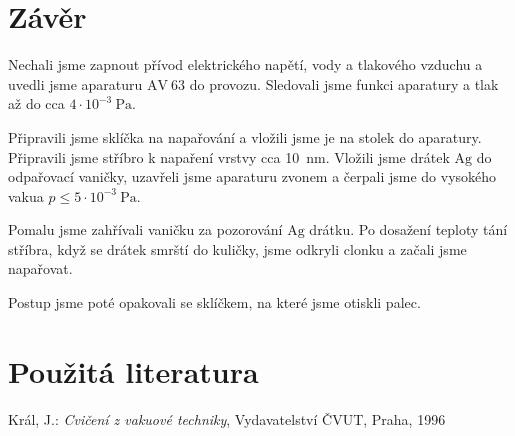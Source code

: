 \documentclass[english]{article}
\newcommand{\unit}[1]{~\mathrm{#1}}
\begin{document}
\section{Závěr}
	Nechali jsme zapnout přívod elektrického napětí, vody a tlakového vzduchu a uvedli jsme aparaturu $\mathrm{AV~63}$ do provozu. Sledovali jsme funkci aparatury a tlak až do cca $4\cdot 10^{-3}\unit{Pa}$. 
	
	Připravili jsme sklíčka na napařování a vložili jsme je na stolek do aparatury. Připravili jsme stříbro k napaření vrstvy cca 10~nm. Vložili jsme drátek $\mathrm{Ag}$ do odpařovací vaničky, uzavřeli jsme aparaturu zvonem a čerpali jsme do vysokého vakua $p\le 5 \cdot 10^{-3}\unit{Pa}$. 
	
	Pomalu jsme zahřívali vaničku za pozorování $\mathrm{Ag}$ drátku. Po dosažení teploty tání stříbra, když se drátek smrští do kuličky, jsme odkryli clonku a začali jsme napařovat.
	
	Postup jsme poté opakovali se sklíčkem, na které jsme otiskli palec.
	
	
\section {Použitá literatura}
\begingroup
\renewcommand{\section}[2]{}

\begin{thebibliography}{9}


Král, J.: \emph{Cvičení z vakuové techniky},
Vydavatelství ČVUT, Praha, 1996



\end{thebibliography}
\endgroup
\setcounter{equation}{0}
\end{document}
